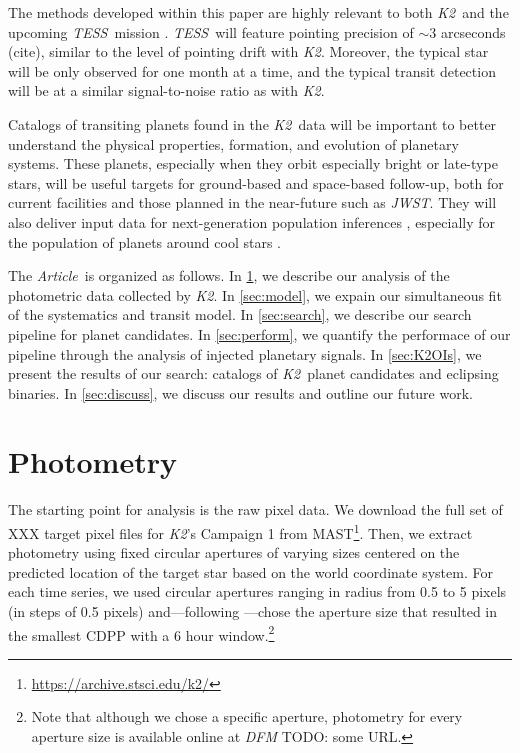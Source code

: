 \documentclass[12pt,preprint]{aastex}
\newcommand{\project}[1]{\textsl{#1}} %
\newcommand{\KT}{\project{K2}}
\newcommand{\tess}{\project{TESS}}
\newcommand{\jwst}{\project{JWST}}
\newcommand{\paper}{\textsl{Article}}
\newcommand{\todo}[3]{{\color{#2} \emph{#1} TODO: #3}}
\newcommand{\dfmtodo}[1]{\todo{DFM}{red}{#1}}
\begin{document}
The methods developed within this paper are highly relevant to both \KT\ and
the upcoming \tess\ mission \citep{Ricker:2014}.
\tess\ will feature pointing precision of $\sim 3$ arcseconds (cite), similar
to the level of pointing drift with \KT.
Moreover, the typical star will be only observed for one month at a time, and
the typical transit detection will be at a similar signal-to-noise ratio as
with \KT.

Catalogs of transiting planets found in the \KT\ data will be important to
better understand the physical properties, formation, and evolution of
planetary systems.
These planets, especially when they orbit especially bright or late-type
stars, will be useful targets for ground-based and space-based follow-up, both
for current facilities and those planned in the near-future such as \jwst.
They will also deliver input data for next-generation population inferences
\citep{dfm}, especially for the population of planets around cool stars
\citep[for example][]{dressing}.

The \paper\ is organized as follows.
In \textsection\ref{sec:phot}, we describe our analysis of the photometric
data collected by \KT.
In \textsection\ref{sec:model}, we expain our simultaneous fit of the
systematics and transit model.
In \textsection\ref{sec:search}, we describe our search pipeline for
planet candidates.
In \textsection\ref{sec:perform}, we quantify the performace of our pipeline
through the analysis of injected planetary signals.
In \textsection\ref{sec:K2OIs}, we present the results of our search:
catalogs of \KT\ planet candidates and eclipsing binaries.
In \textsection\ref{sec:discuss}, we discuss our results and outline our
future work.


\section{Photometry}
\label{sec:phot}

The starting point for analysis is the raw pixel data.
We download the full set of XXX target pixel files for \KT's Campaign 1 from
MAST\footnote{\url{https://archive.stsci.edu/k2/}}.
Then, we extract photometry using fixed circular apertures of varying sizes
centered on the predicted location of the target star based on the world
coordinate system.
For each time series, we used circular apertures ranging in radius from 0.5 to
5 pixels (in steps of 0.5 pixels) and---following
\citet{Vanderburg:2014}---chose the aperture size that resulted in the
smallest CDPP \citep{cdpp}
with a 6 hour window.\footnote{Note that although we chose a specific
aperture, photometry for every aperture size is available online at
\dfmtodo{some URL}.}
\end{document}
